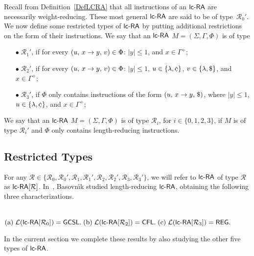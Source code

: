 Recall from Definition~\ref{DefLCRA} that all instructions of an $\lcRA$ are necessarily weight-reducing. These most general $\lcRA$ are said to be of type~$\mathcal{R}_0'$. We now define some restricted types of $\lcRA$ by putting additional restrictions on the form of their instructions. We say that an $\lcRA$ $M=(\Sigma,\Gamma,\Phi)$ is of type

\begin{itemize}
\item[$\bullet\;\mathcal{R}_1'$,] if for every $(u,\,x\rightarrow y,\,v) \in \Phi$: $|y|\le 1$, and $x \in \Gamma^+$;
\item[$\bullet\;\mathcal{R}_2'$,] if for every $(u,\,x\rightarrow y,\,v) \in \Phi$: $|y|\le 1$, $u \in \{\lambda,\leftsentinel\}$, $v \in \{\lambda,\$\}$, and $x \in \Gamma^+$;
\item[$\bullet\;\mathcal{R}_3'$,]  if $\Phi$ only contains instructions of the form $(u,\,x\rightarrow y,\,\$)$, where $|y|\le 1$, $u \in \{\lambda,\leftsentinel\}$, and $x \in \Gamma^+$;
\end{itemize}

We say that an $\lcRA$ $M=(\Sigma,\Gamma,\Phi)$ is of type $\mathcal{R}_i$, for $i \in \{0, 1, 2, 3\}$, if $M$ is of type $\mathcal{R}_i'$ and $\Phi$ only contains length-reducing instructions.

\subsection{Restricted Types}\label{section:ordinary_lcra}

For any $\mathcal{R} \in \{\mathcal{R}_0,\mathcal{R}_0',\mathcal{R}_1,\mathcal{R}_1',\mathcal{R}_2,\mathcal{R}_2',\mathcal{R}_3,\mathcal{R}_3'\}$, we will refer to $\lcRA$ of type $\mathcal{R}$ as ${\lcRA}[\mathcal{R}]$. In~\cite{B10Diploma}, Basovn{\'\i}k  studied length-reducing $\lcRA$, obtaining the following three characterizations.

\begin{theorem}{\rm \cite{B10Diploma}}\label{ThmBasovnik} \\[+0.2cm]
${\rm (a)}\;  {\mathcal L}(\lcRA[0]) = \GCSL.\;
{\rm (b)}\; {\mathcal L}(\lcRA[2]) = \CFL.\;
{\rm (c)}\; {\mathcal L}(\lcRA[3]) = \Reg.$
\end{theorem}

In the current section we complete these results by also studying the other five types of $\lcRA$.
\vspace{+0.2cm}

